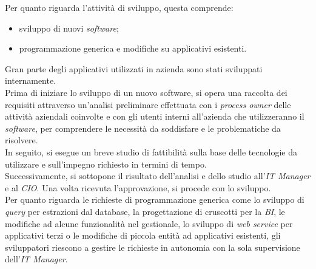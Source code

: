 Per quanto riguarda l'attività di sviluppo, questa comprende: 
\begin{itemize}
	\item sviluppo di nuovi \textit{software}; 
	\item programmazione generica e modifiche su applicativi esistenti.
\end{itemize}
Gran parte degli applicativi utilizzati in azienda sono stati sviluppati internamente.\\
Prima di iniziare lo sviluppo di un nuovo software, si opera una raccolta dei requisiti attraverso un'analisi preliminare effettuata con i \textit{process owner} delle attività aziendali coinvolte e con gli utenti interni all'azienda che utilizzeranno il \textit{software}, per comprendere le necessità da soddisfare e le problematiche da risolvere.\\
In seguito, si esegue un breve studio di fattibilità sulla base delle tecnologie da utilizzare e sull'impegno richiesto in termini di tempo.\\
Successivamente, si sottopone il risultato dell'analisi e dello studio all'\textit{IT Manager} e al \textit{CIO}. Una volta ricevuta l'approvazione, si procede con lo sviluppo.\\ 
Per quanto riguarda le richieste di programmazione generica come lo sviluppo di \textit{query} per estrazioni dal database, la progettazione di cruscotti per la \textit{BI}, le modifiche ad alcune funzionalità nel gestionale, lo sviluppo di \textit{web service} per applicativi terzi o le modifiche di piccola entità ad applicativi esistenti, gli sviluppatori riescono a gestire le richieste in autonomia con la sola supervisione dell'\textit{IT Manager}.



